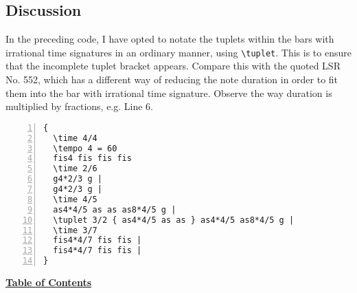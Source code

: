 \subsection{Discussion}

In the preceding code, I have opted to notate the tuplets within the bars with irrational time signatures in an ordinary manner, using \Verb|\tuplet|. This is to ensure that the incomplete tuplet bracket appears. Compare this with the quoted LSR No. 552, which has a different way of reducing the note duration in order to fit them into the bar with irrational time signature. Observe the way duration is multiplied by fractions, e.g. Line 6.

\begin{Verbatim}[numbers=left,xleftmargin=5mm]
 {
  \time 4/4
  \tempo 4 = 60
  fis4 fis fis fis
  \time 2/6
  g4*2/3 g |
  g4*2/3 g |
  \time 4/5
  as4*4/5 as as as8*4/5 g |
  \tuplet 3/2 { as4*4/5 as as } as4*4/5 as8*4/5 g |
  \time 3/7
  fis4*4/7 fis fis |
  fis4*4/7 fis fis |
}
\end{Verbatim}


\hyperref[sec:toc]{\textbf{Table of Contents}}

\vfill \break


